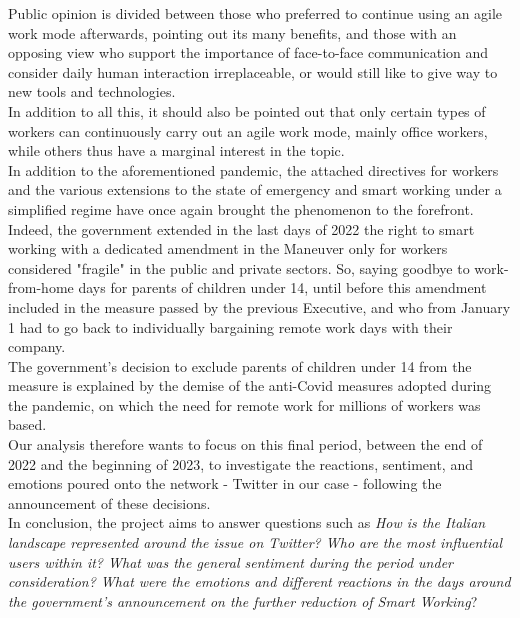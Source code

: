 \documentclass[12pt,journal,compsoc]{IEEEtran}
\begin{document}
Public opinion is divided between those who preferred to continue using an agile work mode afterwards, pointing out its many benefits, and those with an opposing view who support the importance of face-to-face communication and consider daily human interaction irreplaceable, or would still like to give way to new tools and technologies.\\
In addition to all this, it should also be pointed out that only certain types of workers can continuously carry out an agile work mode, mainly office workers, while others thus have a marginal interest in the topic.\\
In addition to the aforementioned pandemic, the attached directives for workers and the various extensions to the state of emergency and smart working under a simplified regime have once again brought the phenomenon to the forefront.\\
Indeed, the government extended in the last days of 2022 the right to smart working with a dedicated amendment in the Maneuver only for workers considered "fragile" in the public and private sectors. So, saying goodbye to work-from-home days for parents of children under 14, until before this amendment included in the measure passed by the previous Executive, and who from January 1 had to go back to individually bargaining remote work days with their company.\\
The government's decision to exclude parents of children under 14 from the measure is explained by the demise of the anti-Covid measures adopted during the pandemic, on which the need for remote work for millions of workers was based.\\
Our analysis therefore wants to focus on this final period, between the end of 2022 and the beginning of 2023, to investigate the reactions, sentiment, and emotions poured onto the network - Twitter in our case - following the announcement of these decisions.\\
In conclusion, the project aims to answer questions such as \textit{How is the Italian landscape represented around the issue on Twitter? Who are the most influential users within it? What was the general sentiment during the period under consideration? What were the emotions and different reactions in the days around the government's announcement on the further reduction of Smart Working}?
\end{document}
